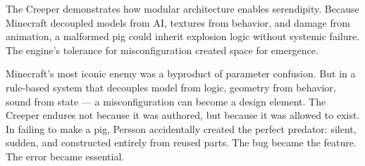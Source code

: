The Creeper demonstrates how modular architecture enables serendipity. Because Minecraft decoupled models from AI, textures from behavior, and damage from animation, a malformed pig could inherit explosion logic without systemic failure. The engine's tolerance for misconfiguration created space for emergence.

Minecraft's most iconic enemy was a byproduct of parameter confusion. But in a rule-based system that decouples model from logic, geometry from behavior, sound from state — a misconfiguration can become a design element. The Creeper endures not because it was authored, but because it was allowed to exist. In failing to make a pig, Persson accidentally created the perfect predator: silent, sudden, and constructed entirely from reused parts. The bug became the feature. The error became essential.
